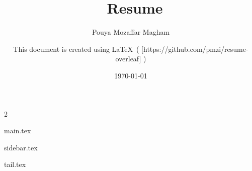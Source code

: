 \documentclass[10pt,a4paper]{resume}
\author{Pouya Mozaffar Magham}
\date{\today}
\title{\@author\ Resume}
\begin{document}

  \begin{paracol}{2}

    \begin{leftcolumn}
      \makecvheader\bigskip
    \end{leftcolumn}

    \begin{leftcolumn}
      {main.tex}
    \end{leftcolumn}

    \begin{rightcolumn}
      {sidebar.tex}
      \signature{%
        This document is created using \LaTeX \ (%
          [https://github.com/pmzi/resume-overleaf]%
        )%
      }
    \end{rightcolumn}

  \end{paracol}

  \newpage
  {tail.tex}
\end{document}
